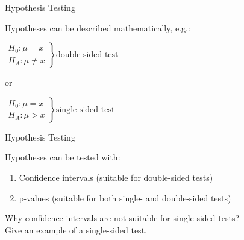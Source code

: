 \begin{frame}{Hypothesis Testing}

    Hypotheses can be described mathematically, e.g.:
    \medskip

    \begin{math}
        \left.
            \begin{array}{l}
                H_0: \mu = x\\
                H_A: \mu \ne x            
            \end{array}
        \right\}
        \text{double-sided test}
    \end{math}
    \medskip
    
    or
    \medskip
    
    \begin{math}
        \left.
            \begin{array}{l}
                H_0: \mu = x\\
                H_A: \mu > x            
            \end{array}
        \right\}
        \text{single-sided test}
    \end{math}

\end{frame}

\begin{frame}{Hypothesis Testing}

    Hypotheses can be tested with:
    \begin{enumerate}
        \item Confidence intervals (suitable for double-sided tests)
        \item p-values (suitable for both single- and double-sided tests)
    \end{enumerate}

    \begin{example}
        \medskip
        Why confidence intervals are not suitable for single-sided tests?\\
        Give an example of a single-sided test.
    \end{example}

\end{frame}

